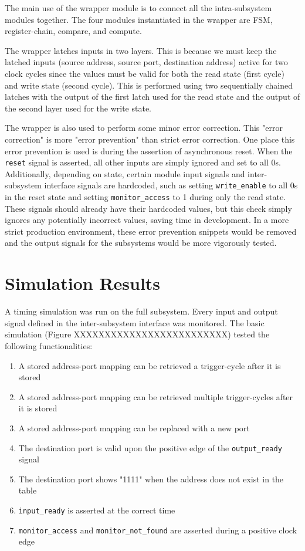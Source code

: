 \documentclass{article}
\begin{document}
The main use of the wrapper module is to connect all the intra-subsystem modules together. The four modules instantiated in the wrapper are FSM, register-chain, compare, and compute. 

The wrapper latches inputs in two layers. This is because we must keep the latched inputs (source address, source port, destination address) active for two clock cycles since the values must be valid for both the read state (first cycle) and write state (second cycle). This is performed using two sequentially chained latches with the output of the first latch used for the read state and the output of the second layer used for the write state.

The wrapper is also used to perform some minor error correction. This "error correction" is more "error prevention" than strict error correction. One place this error prevention is used is during the assertion of asynchronous reset. When the \texttt{reset} signal is asserted, all other inputs are simply ignored and set to all 0s. Additionally, depending on state, certain module input signals and inter-subsystem interface signals are hardcoded, such as setting \texttt{write\_enable} to all 0s in the reset state and setting \texttt{monitor\_access} to 1 during only the read state. These signals should already have their hardcoded values, but this check simply ignores any potentially incorrect values, saving time in development. In a more strict production environment, these error prevention snippets would be removed and the output signals for the subsystems would be more vigorously tested.

\section{Simulation Results}

A timing simulation was run on the full subsystem. Every input and output signal defined in the inter-subsystem interface was monitored. The basic simulation (Figure XXXXXXXXXXXXXXXXXXXXXXXXX) tested the following functionalities:

\begin{enumerate}
\item A stored address-port mapping can be retrieved a trigger-cycle after it is stored
\item A stored address-port mapping can be retrieved multiple trigger-cycles after it is stored
\item A stored address-port mapping can be replaced with a new port
\item The destination port is valid upon the positive edge of the \texttt{output\_ready} signal
\item The destination port shows "1111" when the address does not exist in the table
\item \texttt{input\_ready} is asserted at the correct time
\item \texttt{monitor\_access} and \texttt{monitor\_not\_found} are asserted during a positive clock edge
\end{enumerate}
\end{document}
